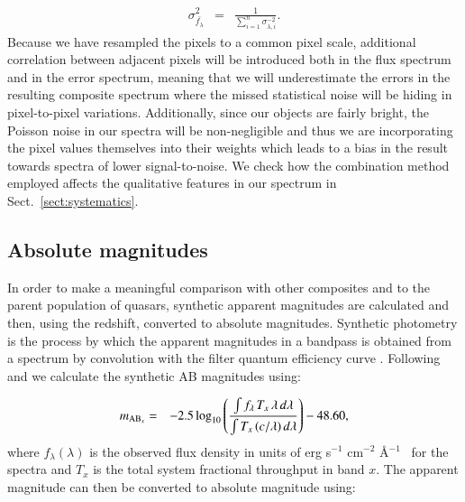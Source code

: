 \documentclass{aa}    %
\newcommand{\eqlabel}[1]{\label{eq:#1}}
\newcommand{\sectionname}{Sect.}
\newcommand{\Sect}[1]{\sectionname~\ref{sect:#1}}
\newcommand{\sect}[1]{\Sect{#1}}
\newcommand{\sectlabel}[1]{\label{sect:#1}}
\newcommand{\fluxunit}{erg s$^{-1}$ cm$^{-2}$ \AA$^{-1}$}
\begin{document}
\begin{eqnarray} \eqlabel{sigma-wmean}
\sigma_{\bar{f_{\lambda}}}^2 &=& \frac{ 1 }{\sum_{i=1}^n \sigma_{\lambda,
i}^{-2}}.
\end{eqnarray}
Because we have resampled the pixels to a common pixel scale, additional
correlation between adjacent pixels will be introduced both in the flux spectrum
and in the error spectrum, meaning that we will underestimate the errors in the
resulting composite spectrum where the missed statistical noise will be hiding
in pixel-to-pixel variations. Additionally, since our objects are fairly bright,
the Poisson noise in our spectra will be non-negligible and thus we are
incorporating the pixel values themselves into their weights which leads to a
bias in the result towards spectra of lower signal-to-noise. We check how the
combination method employed affects the qualitative features in our spectrum in
\sect{systematics}.

\subsection{Absolute magnitudes} \sectlabel{absmag}

In order to make a meaningful comparison with other composites and to the parent
population of quasars, synthetic apparent magnitudes are calculated and then,
using the redshift, converted to absolute magnitudes. Synthetic photometry is
the process by which the apparent magnitudes in a bandpass is obtained from a
spectrum by convolution with the filter quantum efficiency curve
\citep{Bessell2005}. Following \citet{Bessell2012} and \citet{Casagrande2014} we
calculate the synthetic AB magnitudes using:

\begin{eqnarray}\eqlabel{abmag}
m_{\textmd{AB}_x} &=& -2.5 \log_{10} \left(  \frac{\int f_\lambda \,  T_{x}  \,
\lambda \,  d\lambda} 
{\int  T_{x} \,  (c / \lambda) \,  d\lambda} \right) - 48.60,
\end{eqnarray}
where $f_\lambda (\lambda)$ is the observed flux density in units of \fluxunit~
for the spectra and $T_{x} $ is the total system
fractional throughput in band $x$. The apparent magnitude can then be converted
to absolute magnitude using:
\end{document}
